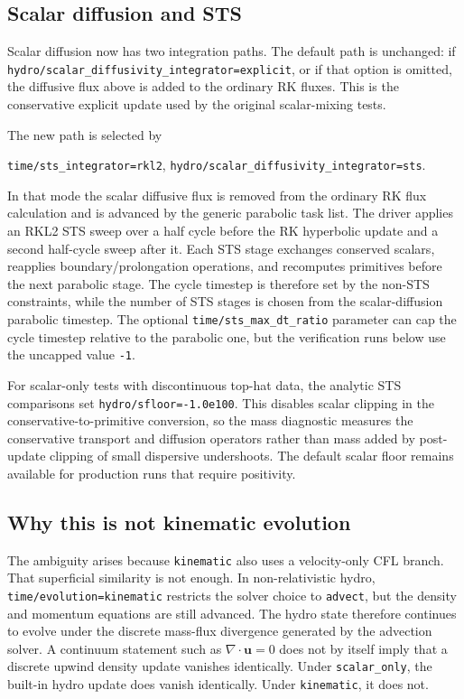 \documentclass[twocolumn]{aastex7}
\newcommand{\code}[1]{\texttt{#1}}
\newcommand{\SO}{\code{scalar\_only}\xspace}
\newcommand{\kin}{\code{kinematic}\xspace}
\begin{document}
\subsection{Scalar diffusion and STS}
Scalar diffusion now has two integration paths. The default path is unchanged: if \code{hydro/scalar\_diffusivity\_integrator=explicit}, or if that option is omitted, the diffusive flux above is added to the ordinary RK fluxes. This is the conservative explicit update used by the original scalar-mixing tests.

The new path is selected by
\begin{center}
\code{time/sts\_integrator=rkl2},\qquad
\code{hydro/scalar\_diffusivity\_integrator=sts}.
\end{center}
In that mode the scalar diffusive flux is removed from the ordinary RK flux calculation and is advanced by the generic parabolic task list. The driver applies an RKL2 STS sweep over a half cycle before the RK hyperbolic update and a second half-cycle sweep after it. Each STS stage exchanges conserved scalars, reapplies boundary/prolongation operations, and recomputes primitives before the next parabolic stage. The cycle timestep is therefore set by the non-STS constraints, while the number of STS stages is chosen from the scalar-diffusion parabolic timestep. The optional \code{time/sts\_max\_dt\_ratio} parameter can cap the cycle timestep relative to the parabolic one, but the verification runs below use the uncapped value \code{-1}.

For scalar-only tests with discontinuous top-hat data, the analytic STS comparisons set \code{hydro/sfloor=-1.0e100}. This disables scalar clipping in the conservative-to-primitive conversion, so the mass diagnostic measures the conservative transport and diffusion operators rather than mass added by post-update clipping of small dispersive undershoots. The default scalar floor remains available for production runs that require positivity.

\subsection{Why this is not kinematic evolution}
The ambiguity arises because \kin also uses a velocity-only CFL branch. That superficial similarity is not enough. In non-relativistic hydro, \code{time/evolution=kinematic} restricts the solver choice to \code{advect}, but the density and momentum equations are still advanced. The hydro state therefore continues to evolve under the discrete mass-flux divergence generated by the advection solver. A continuum statement such as $\nabla\cdot\mathbf{u}=0$ does not by itself imply that a discrete upwind density update vanishes identically. Under \SO, the built-in hydro update does vanish identically. Under \kin, it does not.
\end{document}
